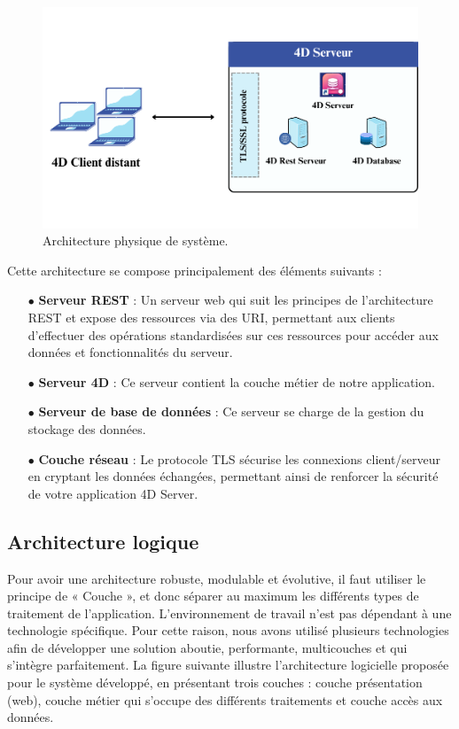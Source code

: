 \begin{figure}[H]
    \centering
    \includegraphics[width=15cm]{Figures/architecturePhysique.png}
    \caption{Architecture physique de système.}
\end{figure}

Cette architecture se compose principalement des éléments suivants :

\begin{itemize}
    \item[$\bullet$] \textbf{Serveur REST} : Un serveur web qui suit les principes de l'architecture REST et expose des ressources via des URI, permettant aux clients d'effectuer des opérations standardisées sur ces ressources pour accéder aux données et fonctionnalités du serveur.
    \item[$\bullet$] \textbf{Serveur 4D} : Ce serveur contient la couche métier de notre application.
    \item[$\bullet$] \textbf{Serveur de base de données} : Ce serveur se charge de la gestion du stockage des données.
    \item[$\bullet$] \textbf{Couche réseau} : Le protocole TLS sécurise les connexions client/serveur en cryptant les données échangées, permettant ainsi de renforcer la sécurité de votre application 4D Server.
\end{itemize}

\subsection{Architecture logique}

Pour avoir une architecture robuste, modulable et évolutive, il faut utiliser le principe
de « Couche », et donc séparer au maximum les différents types de traitement de l’application. L’environnement de travail n’est pas dépendant à une technologie spécifique.
Pour cette raison, nous avons utilisé plusieurs technologies afin de développer une solution aboutie, performante, multicouches et qui s’intègre parfaitement. La figure suivante
illustre l’architecture logicielle proposée pour le système développé, en présentant trois
couches : couche présentation (web), couche métier qui s’occupe des différents traitements
et couche accès aux données.



